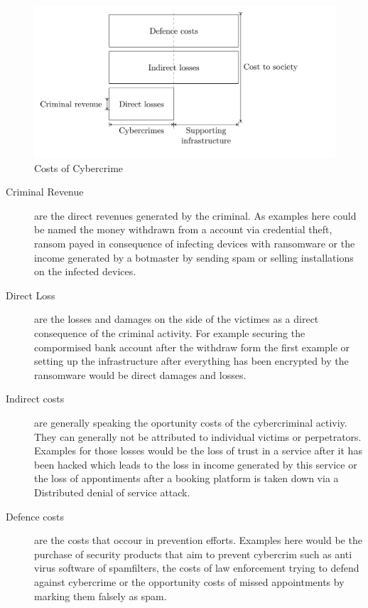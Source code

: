 \begin{figure}[ht]
\begin{center}
\includegraphics[scale=0.25]{Talk11/CostsCybercrime}
\end{center}
\caption{Costs of Cybercrime \cite{Anderson19}}
\label{CostsCybercrime}
\end{figure}

\begin{description}
\item[Criminal Revenue] are the direct revenues generated by the criminal. As examples here could be named the money withdrawn from a account via credential theft, ransom payed in consequence of infecting devices with ransomware or the income generated by a botmaster by sending spam or selling installations on the infected devices.  \cite{Anderson19}

\item[Direct Loss]  are the losses  and damages on the side of the victimes as a direct consequence of the criminal activity. For example securing the compormised bank account after the withdraw form the first example or setting up the infrastructure after everything has been encrypted by the ransomware would be direct damages and losses. \cite{Anderson19}

\item[Indirect costs] are generally speaking the oportunity costs of the cybercriminal activiy. They can generally not be attributed to individual victims or perpetrators. Examples for those losses would be the loss of trust in a service after it has been hacked which leads to the loss in income generated by this service or the loss of appontiments after a booking platform is taken down via a Distributed denial of service attack. \cite{Anderson19}
 
\item[Defence costs] are the costs that occour in prevention efforts. Examples here would be the purchase of security products that aim to prevent cybercrim such as anti virus software of spamfilters, the costs of law enforcement trying to defend against cybercrime or the opportunity costs of missed appointments by marking them falsely as spam. \cite{Anderson19}
\end{description}


